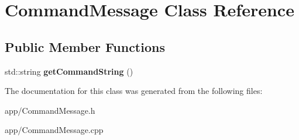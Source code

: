 \hypertarget{class_command_message}{}\section{Command\+Message Class Reference}
\label{class_command_message}
\subsection*{Public Member Functions}
\begin{DoxyCompactItemize}
\item 
\hypertarget{class_command_message_af7597c082fb528a527aa2400b5c5ab79}{}std\+::string {\bfseries get\+Command\+String} ()\label{class_command_message_af7597c082fb528a527aa2400b5c5ab79}

\end{DoxyCompactItemize}


The documentation for this class was generated from the following files\+:\begin{DoxyCompactItemize}
\item 
app/Command\+Message.\+h\item 
app/Command\+Message.\+cpp\end{DoxyCompactItemize}

